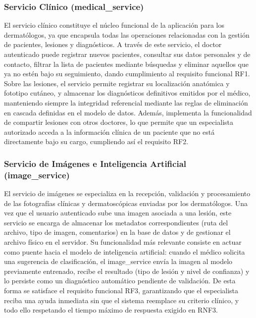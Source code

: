 \subsubsection{Servicio Clínico (medical\_service)}
El servicio clínico constituye el núcleo funcional de la aplicación para los dermatólogos, 
ya que encapsula todas las operaciones relacionadas con la gestión de pacientes, 
lesiones y diagnósticos. A través de este servicio, el doctor autenticado puede 
registrar nuevos pacientes, consultar sus datos personales y de contacto, filtrar la 
lista de pacientes mediante búsquedas y eliminar aquellos que ya no estén bajo su 
seguimiento, dando cumplimiento al requisito funcional RF1. Sobre las lesiones, el 
servicio permite registrar su localización anatómica y fototipo cutáneo, 
y almacenar los diagnósticos definitivos emitidos por el médico, manteniendo siempre la 
integridad referencial mediante las reglas de eliminación en cascada definidas en el 
modelo de datos. Además, implementa la funcionalidad de compartir lesiones con otros 
doctores, lo que permite que un especialista autorizado acceda a la información 
clínica de un paciente que no está directamente bajo su cargo, cumpliendo así el 
requisito RF2.

\subsubsection{Servicio de Imágenes e Inteligencia Artificial (image\_service)}
El servicio de imágenes se especializa en la recepción, validación y procesamiento de 
las fotografías clínicas y dermatoscópicas enviadas por los dermatólogos. Una vez que el 
usuario autenticado sube una imagen asociada a una lesión, este servicio se encarga de 
almacenar los metadatos correspondientes (ruta del archivo, tipo de imagen, comentarios) 
en la base de datos y de gestionar el archivo físico en el servidor. Su funcionalidad más 
relevante consiste en actuar como puente hacia el modelo de inteligencia artificial: 
cuando el médico solicita una sugerencia de clasificación, el image\_service envía la 
imagen al modelo previamente entrenado, recibe el resultado (tipo de lesión y nivel de 
confianza) y lo persiste como un diagnóstico automático pendiente de validación. 
De esta forma se satisface el requisito funcional RF3, garantizando que el especialista 
reciba una ayuda inmediata sin que el sistema reemplace su criterio clínico, 
y todo ello respetando el tiempo máximo de respuesta exigido en RNF3.

